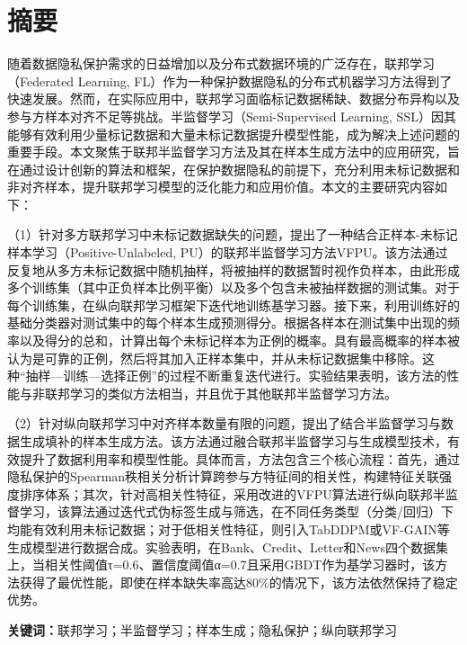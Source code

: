 


\chapter{摘\quad 要}
\xiaosi

随着数据隐私保护需求的日益增加以及分布式数据环境的广泛存在，联邦学习（Federated Learning, FL）作为一种保护数据隐私的分布式机器学习方法得到了快速发展。然而，在实际应用中，联邦学习面临标记数据稀缺、数据分布异构以及参与方样本对齐不足等挑战。半监督学习（Semi-Supervised Learning, SSL）因其能够有效利用少量标记数据和大量未标记数据提升模型性能，成为解决上述问题的重要手段。本文聚焦于联邦半监督学习方法及其在样本生成方法中的应用研究，旨在通过设计创新的算法和框架，在保护数据隐私的前提下，充分利用未标记数据和非对齐样本，提升联邦学习模型的泛化能力和应用价值。本文的主要研究内容如下：  

（1）针对多方联邦学习中未标记数据缺失的问题，提出了一种结合正样本-未标记样本学习（Positive-Unlabeled, PU）的联邦半监督学习方法VFPU。该方法通过反复地从多方未标记数据中随机抽样，将被抽样的数据暂时视作负样本，由此形成多个训练集（其中正负样本比例平衡）以及多个包含未被抽样数据的测试集。对于每个训练集，在纵向联邦学习框架下迭代地训练基学习器。接下来，利用训练好的基础分类器对测试集中的每个样本生成预测得分。根据各样本在测试集中出现的频率以及得分的总和，计算出每个未标记样本为正例的概率。具有最高概率的样本被认为是可靠的正例，然后将其加入正样本集中，并从未标记数据集中移除。这种“抽样—训练—选择正例”的过程不断重复迭代进行。实验结果表明，该方法的性能与非联邦学习的类似方法相当，并且优于其他联邦半监督学习方法。

（2）针对纵向联邦学习中对齐样本数量有限的问题，提出了结合半监督学习与数据生成填补的样本生成方法。该方法通过融合联邦半监督学习与生成模型技术，有效提升了数据利用率和模型性能。具体而言，方法包含三个核心流程：首先，通过隐私保护的Spearman秩相关分析计算跨参与方特征间的相关性，构建特征关联强度排序体系；其次，针对高相关性特征，采用改进的VFPU算法进行纵向联邦半监督学习，该算法通过迭代式伪标签生成与筛选，在不同任务类型（分类/回归）下均能有效利用未标记数据；对于低相关性特征，则引入TabDDPM或VF-GAIN等生成模型进行数据合成。实验表明，在Bank、Credit、Letter和News四个数据集上，当相关性阈值τ=0.6、置信度阈值α=0.7且采用GBDT作为基学习器时，该方法获得了最优性能，即使在样本缺失率高达80\%的情况下，该方法依然保持了稳定优势。
  
\noindent\songti\textbf{关键词：}联邦学习；半监督学习；样本生成；隐私保护；纵向联邦学习

\clearpage